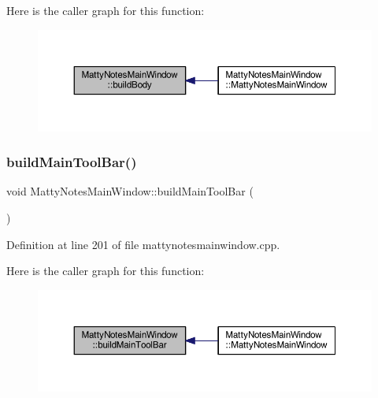 Here is the caller graph for this function\+:
\nopagebreak
\begin{figure}[H]
\begin{center}
\leavevmode
\includegraphics[width=350pt]{classMattyNotesMainWindow_af75387f6dfa1be40552c54a91795d196_icgraph}
\end{center}
\end{figure}
\hypertarget{classMattyNotesMainWindow_a060784fda6abdec934d9c37843e8d05a}{}\label{classMattyNotesMainWindow_a060784fda6abdec934d9c37843e8d05a} 
\subsubsection{\texorpdfstring{build\+Main\+Tool\+Bar()}{buildMainToolBar()}}
{\footnotesize\ttfamily void Matty\+Notes\+Main\+Window\+::build\+Main\+Tool\+Bar (\begin{DoxyParamCaption}{ }\end{DoxyParamCaption})\hspace{0.3cm}{\ttfamily [private]}}



Definition at line 201 of file mattynotesmainwindow.\+cpp.

Here is the caller graph for this function\+:
\nopagebreak
\begin{figure}[H]
\begin{center}
\leavevmode
\includegraphics[width=350pt]{classMattyNotesMainWindow_a060784fda6abdec934d9c37843e8d05a_icgraph}
\end{center}
\end{figure}
\hypertarget{classMattyNotesMainWindow_a1ded942c8dec7b0443eef1c51a425af4}{}\label{classMattyNotesMainWindow_a1ded942c8dec7b0443eef1c51a425af4} 
